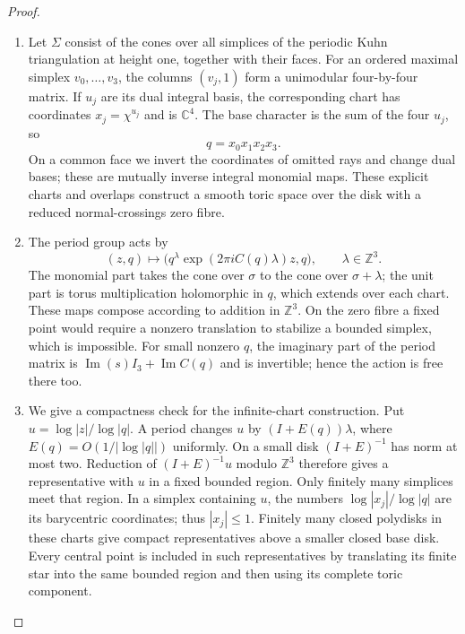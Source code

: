 \begin{proof}
\begin{enumerate}[label=\arabic*.]
\item Let $\Sigma$ consist of the cones over all simplices of the periodic
Kuhn triangulation at height one, together with their faces.  For an
ordered maximal simplex $v_0,\ldots,v_3$, the columns $(v_j,1)$ form a
unimodular four-by-four matrix.  If $u_j$ are its dual integral basis,
the corresponding chart has coordinates $x_j=\chi^{u_j}$ and is
$\mathbb C^4$.  The base character is the sum of the four $u_j$, so
\[
q=x_0x_1x_2x_3.
\]
On a common face we invert the coordinates of omitted rays and change
dual bases; these are mutually inverse integral monomial maps.  These
explicit charts and overlaps construct a smooth toric space over the
disk with a reduced normal-crossings zero fibre.

\item The period group acts by
\[
(z,q)\longmapsto
\bigl(q^\lambda\exp(2\pi iC(q)\lambda)z,q\bigr),
\qquad \lambda\in\mathbb Z^3.
\]
The monomial part takes the cone over $\sigma$ to the cone over
$\sigma+\lambda$; the unit part is torus multiplication holomorphic in
$q$, which extends over each chart.  These maps compose according to
addition in $\mathbb Z^3$.  On the zero fibre a fixed point would
require a nonzero translation to stabilize a bounded simplex, which
is impossible.  For small nonzero $q$, the imaginary part of the
period matrix is $\operatorname{Im}(s)I_3+\operatorname{Im}C(q)$ and
is invertible; hence the action is free there too.

\item We give a compactness check for the infinite-chart construction.  Put
$u=\log|z|/\log|q|$.  A period changes $u$ by
$(I+E(q))\lambda$, where $E(q)=O(1/|\log|q||)$ uniformly.
On a small disk $(I+E)^{-1}$ has norm at most two.  Reduction of
$(I+E)^{-1}u$ modulo $\mathbb Z^3$ therefore gives a representative
with $u$ in a fixed bounded region.  Only finitely many simplices
meet that region.  In a simplex containing $u$, the numbers
$\log|x_j|/\log|q|$ are its barycentric coordinates; thus
$|x_j|\leq1$.  Finitely many closed polydisks in these charts give
compact representatives above a smaller closed base disk.  Every
central point is included in such representatives by translating its
finite star into the same bounded region and then using its complete
toric component.


\end{enumerate}
\end{proof}

